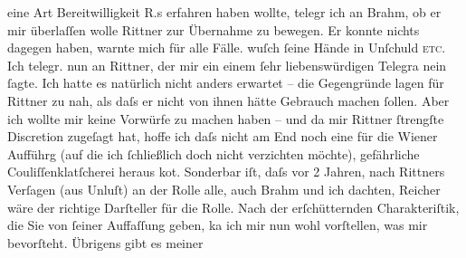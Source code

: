 \begin{ledgroupsized}[t]{13cm}
               eine Art Bereitwilligkeit R.s erfahren haben
               wollte, telegr ich an Brahm, ob er mir
               überlaſſen wolle Rittner zur Übernahme zu
               bewegen. Er konnte nichts dagegen haben, warnte mich für alle Fälle. wuſch ſeine
               Hände in Unſchuld \textsc{etc.} Ich telegr. nun an Rittner, der mir ein einem ſehr liebenswürdigen Telegra{\geminationm} nein ſagte. Ich hatte es natürlich nicht anders
               erwartet – die Gegengründe lagen für Rittner
               zu nah, als daſs er nicht von ihnen hätte {\pb}Gebrauch machen ſollen. Aber ich wollte mir keine Vorwürfe zu machen haben – und da
               mir Rittner ſtrengſte Discretion zugeſagt hat,
               hoffe ich daſs nicht am End noch eine für die Wiener Aufführg (auf die ich ſchließlich doch nicht verzichten möchte),
               gefährliche Couliſſenklatſcherei heraus ko{\geminationm}t. Sonderbar
               iſt, daſs vor 2 Jahren, nach Rittners Verſagen
               (aus Unluſt) an der Rolle alle, auch Brahm und
               ich dachten, Reicher wäre der richtige
               Darſteller für die Rolle. Nach der erſchütternden Charakteriſtik, die Sie von ſeiner
               Auffaſſung geben, ka{\geminationn} ich mir nun wohl vorſtellen, was
               mir {\pb}bevorſteht. Übrigens gibt es meiner

\end{ledgroupsized}
